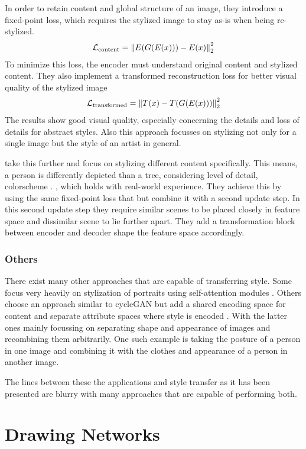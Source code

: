 In order to retain content and global structure of an image, they introduce a fixed-point loss, which requires the stylized image to stay as-is when being re-stylized.
\begin{align}
    \mathcal{L}_{\text{content}} = \left\lVert E(G(E(x))) - E(x)\right\rVert^2_2
\end{align}
To minimize this loss, the encoder must understand original content and stylized content.
They also implement a transformed reconstruction loss for better visual quality of the stylized image
\begin{align}
    \mathcal{L}_{\text{transformed}} = \left\lVert T(x) - T(G(E(x)))\right\rVert^2_2
\end{align}
The results show good visual quality, especially concerning the details and loss of details for abstract styles.
Also this approach focusses on stylizing not only for a single image but the style of an artist in general.

\citeauthor*{dima} take this further and focus on stylizing different content specifically.
This means, a person is differently depicted than a tree, considering level of detail, colorscheme \etc. , which holds with real-world experience.
They achieve this by using the same fixed-point loss that \citeauthor*{artsiom} but combine it with a second update step.
In this second update step they require similar scenes to be placed closely in feature space and dissimilar scene to lie further apart.
They add a transformation block between encoder and decoder shape the feature space accordingly.

\subsubsection{Others}
There exist many other approaches that are capable of transferring style.
Some focus very heavily on stylization of portraits using self-attention modules \cite{ugatit}.
Others choose an approach similar to cycleGAN but add a shared encoding space for content and separate attribute spaces where style is encoded \cite{unit, munit, drit, drit++}.
With the latter ones mainly focussing on separating shape and appearance of images and recombining them arbitrarily.
One such example is taking the posture of a person in one image and combining it with the clothes and appearance of a person in another image.

The lines between these the applications and style transfer as it has been presented are blurry with many approaches that are capable of performing both.


\section{Drawing Networks}



